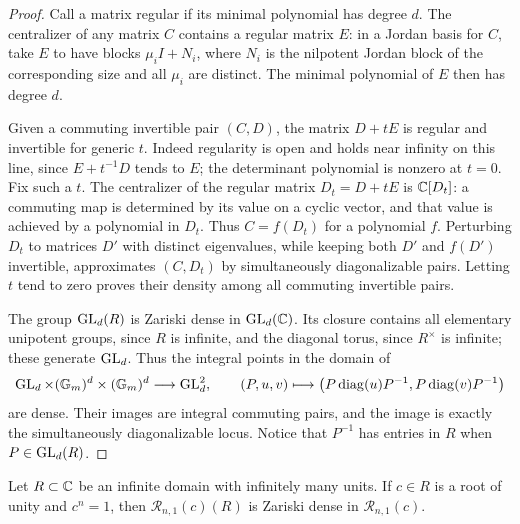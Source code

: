 \begin{proof}
Call a matrix regular if its minimal polynomial has degree \(d\).
The centralizer of any matrix \(C\) contains a regular matrix \(E\):
in a Jordan basis for \(C\), take \(E\) to have blocks
\(\mu_i I+N_i\), where \(N_i\) is the nilpotent Jordan block of the
corresponding size and all \(\mu_i\) are distinct.  The minimal
polynomial of \(E\) then has degree \(d\).

Given a commuting invertible pair \((C,D)\), the matrix
\(D+tE\) is regular and invertible for generic \(t\).
Indeed regularity is open and holds near infinity on this line, since
\(E+t^{-1}D\) tends to \(E\); the determinant polynomial is nonzero
at \(t=0\).  Fix such a \(t\).  The centralizer of the regular matrix
\(D_t=D+tE\) is \(\mathbb C[D_t]\): a commuting map is determined by its
value on a cyclic vector, and that value is achieved by a polynomial
in \(D_t\).  Thus \(C=f(D_t)\) for a polynomial \(f\).
Perturbing \(D_t\) to matrices \(D'\) with distinct
eigenvalues, while keeping both \(D'\) and \(f(D')\) invertible,
approximates \((C,D_t)\) by simultaneously diagonalizable pairs.
Letting \(t\) tend to zero proves their density among all commuting
invertible pairs.

The group \(\operatorname{GL}_d(R)\) is Zariski dense in \(\operatorname{GL}_d(\mathbb C)\).
Its closure contains all elementary unipotent groups, since \(R\)
is infinite, and the diagonal torus, since \(R^\times\) is infinite;
these generate \(\operatorname{GL}_d\).  Thus the integral points in the domain of
\[
 \operatorname{GL}_d\times(\mathbb G_m)^d\times(\mathbb G_m)^d
 \longrightarrow \operatorname{GL}_d^2,
 \qquad
 (P,u,v)\longmapsto
 \bigl(P\operatorname{diag}(u)P^{-1},
       P\operatorname{diag}(v)P^{-1}\bigr)
\]
are dense.  Their images are integral commuting pairs, and the image
is exactly the simultaneously diagonalizable locus.  Notice that
\(P^{-1}\) has entries in \(R\) when \(P\in\operatorname{GL}_d(R)\).
\end{proof}

\begin{lemma}\label{lem:torus-density}
Let \(R\subset\mathbb C\) be an infinite domain with infinitely many units.
If \(c\in R\) is a root of unity and \(c^n=1\), then
\(\mathcal R_{n,1}(c)(R)\) is Zariski dense in
\(\mathcal R_{n,1}(c)\).
\end{lemma}

